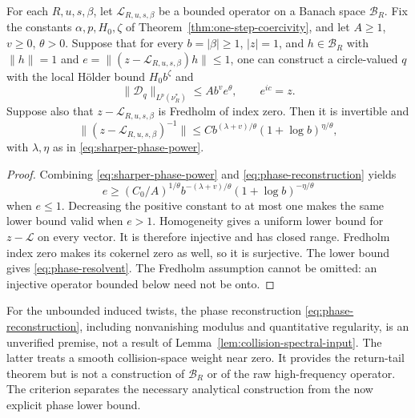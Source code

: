 \begin{theorem}
\label{thm:phase-resolvent-criterion}
For each $R,u,s,\beta$, let $\mathcal L_{R,u,s,\beta}$ be a bounded
operator on a Banach space $\mathcal B_R$. Fix the constants
$\alpha,p,H_0,\zeta$ of Theorem~\ref{thm:one-step-coercivity}, and let
$A\ge1$, $v\ge0$, $\theta>0$. Suppose that for every $b=|\beta|\ge1$,
$|z|=1$, and $h\in\mathcal B_R$ with $\|h\|=1$ and
$e=\|(z-\mathcal L_{R,u,s,\beta})h\|\le1$, one can construct a
circle-valued $q$ with the local H\"older bound $H_0b^\zeta$ and
\begin{equation}\label{eq:phase-reconstruction}
 \|\mathcal D_q\|_{L^p(\nu_R^*)}\le A b^v e^\theta,
 \qquad e^{ic}=z.
\end{equation}
Suppose also that $z-\mathcal L_{R,u,s,\beta}$ is Fredholm of index
zero. Then it is invertible and
\begin{equation}\label{eq:phase-resolvent}
 \|(z-\mathcal L_{R,u,s,\beta})^{-1}\|
 \le C b^{(\lambda+v)/\theta}
                (1+\log b)^{\eta/\theta},
\end{equation}
with $\lambda,\eta$ as in \eqref{eq:sharper-phase-power}.
\end{theorem}
\begin{proof}
Combining \eqref{eq:sharper-phase-power} and
\eqref{eq:phase-reconstruction} yields
\[
 e\ge (C_0/A)^{1/\theta}
       b^{-(\lambda+v)/\theta}(1+\log b)^{-\eta/\theta}
\]
when $e\le1$. Decreasing the positive constant to at most one makes
the same lower bound valid when $e>1$. Homogeneity gives a uniform
lower bound for $z-\mathcal L$ on every vector. It is therefore
injective and has closed range. Fredholm index zero makes its cokernel
zero as well, so it is surjective. The lower bound gives
\eqref{eq:phase-resolvent}. The Fredholm assumption cannot be omitted:
an injective operator bounded below need not be onto.
\end{proof}

For the unbounded induced twists, the phase reconstruction
\eqref{eq:phase-reconstruction}, including nonvanishing modulus and
quantitative regularity, is an unverified premise, not a result of
Lemma~\ref{lem:collision-spectral-input}. The latter treats a smooth
collision-space weight near zero. It provides the return-tail theorem
but is not a construction of $\mathcal B_R$ or of the raw high-frequency
operator. The criterion separates the necessary analytical construction
from the now explicit phase lower bound.

